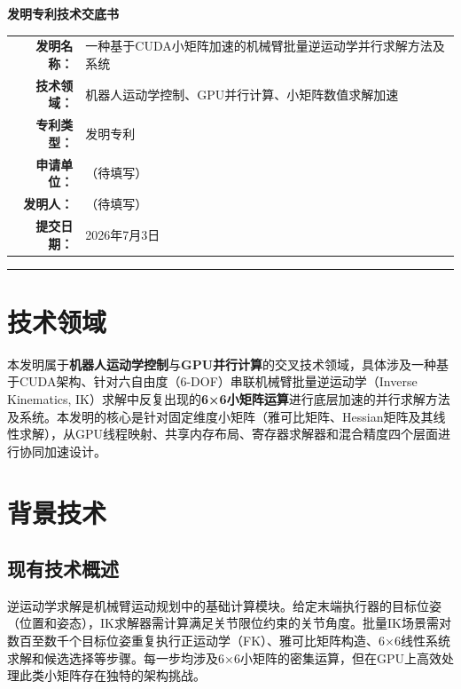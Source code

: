 \documentclass[a4paper,12pt]{ctexart}
\begin{document}
\begin{center}
{\LARGE\bfseries 发明专利技术交底书}\\[1cm]

\begin{tabular}{rl}
\textbf{发明名称：} & 一种基于CUDA小矩阵加速的机械臂批量逆运动学并行求解方法及系统\\[0.3cm]
\textbf{技术领域：} & 机器人运动学控制、GPU并行计算、小矩阵数值求解加速\\[0.3cm]
\textbf{专利类型：} & 发明专利\\[0.3cm]
\textbf{申请单位：} & （待填写）\\[0.3cm]
\textbf{发明人：}   & （待填写）\\[0.3cm]
\textbf{提交日期：} & 2026年7月3日\\[0.3cm]
\end{tabular}
\end{center}

\vspace{0.5cm}\hrule\vspace{0.5cm}

\section{技术领域}

本发明属于\textbf{机器人运动学控制}与\textbf{GPU并行计算}的交叉技术领域，具体涉及一种基于CUDA架构、针对六自由度（6-DOF）串联机械臂批量逆运动学（Inverse Kinematics, IK）求解中反复出现的\textbf{6×6小矩阵运算}进行底层加速的并行求解方法及系统。本发明的核心是针对固定维度小矩阵（雅可比矩阵、Hessian矩阵及其线性求解），从GPU线程映射、共享内存布局、寄存器求解器和混合精度四个层面进行协同加速设计。

\section{背景技术}

\subsection{现有技术概述}

逆运动学求解是机械臂运动规划中的基础计算模块。给定末端执行器的目标位姿（位置和姿态），IK求解器需计算满足关节限位约束的关节角度。批量IK场景需对数百至数千个目标位姿重复执行正运动学（FK）、雅可比矩阵构造、6×6线性系统求解和候选选择等步骤。每一步均涉及6×6小矩阵的密集运算，但在GPU上高效处理此类小矩阵存在独特的架构挑战。
\end{document}
